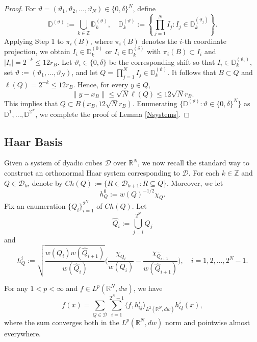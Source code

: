 \documentclass[12pt]{amsart}
\begin{document}
\begin{proof}
For $\vartheta=(\vartheta_1,\vartheta_2,\ldots,\vartheta_N)\in\{0,\delta\}^N$, define
$$\mathbb{D}^{(\vartheta)}:=\bigcup_{k\in\mathbb{Z}}\mathbb{D}_k^{(\vartheta)},\quad \mathbb{D}_k^{(\vartheta)}:=\left\{\prod_{j=1}^N I_j: I_j\in \mathbb{D}_k^{(\vartheta_j)}\right\}.$$
Applying Step 1 to $\pi_i(B)$, where $\pi_i(B)$ denotes the $i$-th coordinate projection, we obtain $I_i\in\mathbb{D}_k^{(0)}$ or $I_i\in\mathbb{D}_k^{(\delta)}$ with $\pi_i(B)\subset I_i$ and $|I_i|=2^{-k}\leq 12 r_B$. Let $\vartheta_i\in\{0,\delta\}$
be the corresponding shift so that $I_i\in\mathbb D_k^{(\vartheta_i)}$, set $\vartheta:=(\vartheta_1,\ldots,\vartheta_N)$, and let $Q=\prod_{j=1}^NI_j\in\mathbb{D}_k^{(\vartheta)}$. It follows that $B\subset Q$ and $\ell(Q)=2^{-k}\leq 12r_B$. Hence, for every $y\in Q$,
$$\|y-x_B\|\leq \sqrt{N}\ell(Q)\leq 12\sqrt{N}r_B.$$
This implies that $Q\subset B(x_B,12\sqrt{N}r_B)$. Enumerating $\big\{\mathbb D^{(\vartheta)}:\vartheta\in\{0,\delta\}^N\big\}$ as
$\mathbb D^1,\ldots,\mathbb D^{2^N}$, we complete the proof of Lemma \ref{Nsystems}.
\end{proof}





\subsection{Haar Basis}\label{HaarSection}

{}

Given a system of dyadic cubes $\mathscr{D}$ over $\mathbb{R}^N$, we now recall the standard way to construct an orthonormal Haar system corresponding to $\mathscr{D}$. For each $k\in\mathbb{Z}$ and $Q\in\mathscr{D}_k$, denote by $Ch(Q):=\{R\in\mathscr{D}_{k+1}:R\subseteq Q\}$. Moreover,  we let
$$h_Q^0:=w(Q)^{-1/2}\chi_Q.$$
Fix an enumeration $\{Q_i\}_{i=1}^{2^N}$ of $Ch(Q)$. Let
$$\hat{Q}_i:=\bigcup_{j=i}^{2^N}Q_j$$
and
$$h_Q^i:=\sqrt{\frac{w(Q_i)w(\hat{Q}_{i+1})}{w(\hat{Q}_i)}}\Bigg(\frac{\chi_{Q_i}}{w(Q_i)}-\frac{\chi_{\hat{Q}_{i+1}}}{w(\hat{Q}_{i+1})}\Bigg),\quad i=1,2,\ldots,2^N-1.$$


\begin{lemma}\label{Haarexpansion}
For any $1<p<\infty$ and $f\in
    L^p(\mathbb{R}^N,dw)$, we have
    \[
        f(x)
        =  \sum_{Q\in\mathscr{D}}\sum_{i=1}^{2^N-1}
            \langle f,h^{i}_{Q}\rangle_{L^2(\mathbb{R}^N,dw)} h^{i}_{Q}(x), %
    \]
    where the sum converges both in the
    $L^p(\mathbb{R}^N,dw)$ norm and pointwise almost everywhere.
 \end{lemma}
\end{document}
